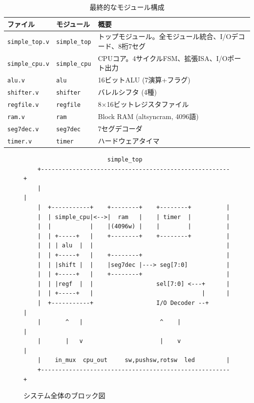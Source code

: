 \documentclass[a4paper,11pt]{ltjsarticle}
\begin{document}
\begin{table}[h]
\centering
\caption{最終的なモジュール構成}
\begin{tabular}{llp{7cm}}
\toprule
ファイル & モジュール & 概要 \\
\midrule
\texttt{simple\_top.v} & \texttt{simple\_top} & トップモジュール。全モジュール統合、I/Oデコード、8桁7セグ \\
\texttt{simple\_cpu.v} & \texttt{simple\_cpu} & CPUコア。4サイクルFSM、拡張ISA、I/Oポート出力 \\
\texttt{alu.v}         & \texttt{alu}         & 16ビットALU (7演算+フラグ) \\
\texttt{shifter.v}     & \texttt{shifter}     & バレルシフタ (4種) \\
\texttt{regfile.v}     & \texttt{regfile}     & 8$\times$16ビットレジスタファイル \\
\texttt{ram.v}         & \texttt{ram}         & Block RAM (altsyncram, 4096語) \\
\texttt{seg7dec.v}     & \texttt{seg7dec}     & 7セグデコーダ \\
\texttt{timer.v}       & \texttt{timer}       & ハードウェアタイマ \\
\bottomrule
\end{tabular}
\end{table}

\begin{figure}[h]
\centering
\begin{verbatim}
                        simple_top
    +------------------------------------------------------+
    |                                                      |
    |  +-----------+    +--------+    +--------+          |
    |  | simple_cpu|<-->|  ram   |    | timer  |          |
    |  |           |    |(4096w) |    |        |          |
    |  | +-----+   |    +--------+    +--------+          |
    |  | | alu  |  |                                      |
    |  | +-----+   |    +--------+                        |
    |  | |shift |  |    |seg7dec |---> seg[7:0]           |
    |  | +-----+   |    +--------+                        |
    |  | |regf  |  |                  sel[7:0] <---+      |
    |  | +-----+   |                               |      |
    |  +-----------+                  I/O Decoder --+      |
    |       ^   |                      ^    |              |
    |       |   v                      |    v              |
    |    in_mux  cpu_out     sw,pushsw,rotsw  led         |
    +------------------------------------------------------+
\end{verbatim}
\caption{システム全体のブロック図}
\end{figure}
\end{document}
